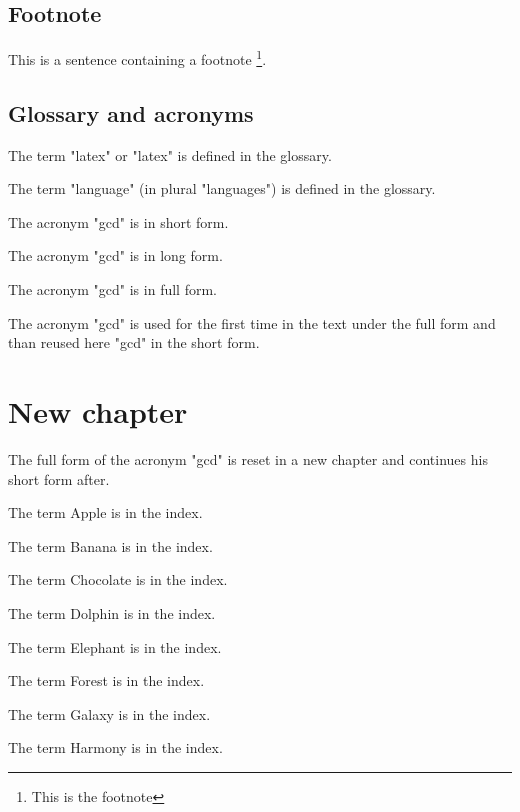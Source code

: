\newpage


\section{Footnote}

This is a sentence containing a footnote \footnote{This is the footnote}.

\newpage


\section{Glossary and acronyms}

The term "\Gls{latex}" or "\gls{latex}" is defined in the glossary.

The term "\gls{language}" (in plural "\glspl{language}") is defined in the glossary.

The acronym "\acrshort{gcd}" is in short form.

The acronym "\acrlong{gcd}" is in long form.

The acronym "\acrfull{gcd}" is in full form.

The acronym "\gls{gcd}" is used for the first time in the text under the full form and than reused here "\gls{gcd}" in the short form.

\chapter*{New chapter}

The full form of the acronym "\gls{gcd}" is reset in a new chapter and continues his short form after.

\newpage

The term Apple  is in the index.

The term Banana  is in the index.

The term Chocolate  is in the index.

The term Dolphin  is in the index.

The term Elephant  is in the index.

The term Forest  is in the index.

The term Galaxy  is in the index.

The term Harmony  is in the index.

